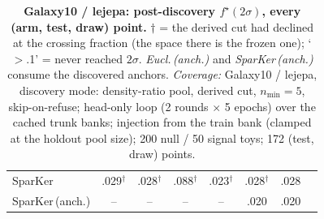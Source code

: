 \begin{table}[t]
\begin{tabular}{lcccccc c}
\quad SparKer & .029$^\dagger$ & .028$^\dagger$ & .088$^\dagger$ & .023$^\dagger$ & .028$^\dagger$ & .028 \\
\quad SparKer\,(anch.) & -- & -- & -- & -- & .020 & .020 \\
\bottomrule
\end{tabular}
\caption{\textbf{Galaxy10 / lejepa: post-discovery $f^\star(2\sigma)$, every (arm, test, draw) point.} $\dagger$ = the derived cut had declined at the crossing fraction (the space there is the frozen one); `$>$.1' = never reached $2\sigma$.  \emph{Eucl.\,(anch.)} and \emph{SparKer\,(anch.)} consume the discovered anchors. \emph{Coverage:} Galaxy10 / lejepa, discovery mode: density-ratio pool, derived cut, $n_{\min}{=}5$, skip-on-refuse; head-only loop (2 rounds $\times$ 5 epochs) over the cached trunk banks; injection from the train bank (clamped at the holdout pool size); 200 null / 50 signal toys; 172 (test, draw) points.}
\label{tab:sigma_galaxy_post_lejepa}
\end{table}
